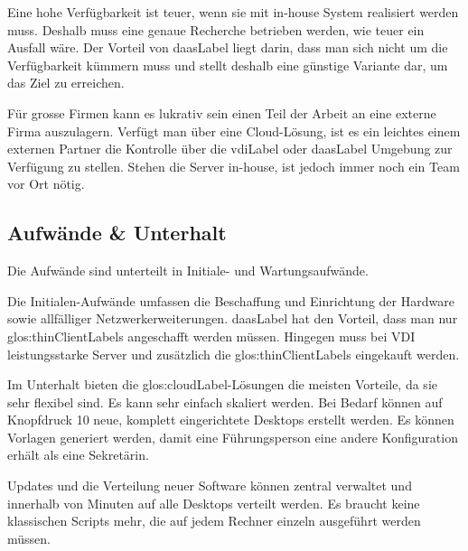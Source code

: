 Eine hohe Verfügbarkeit ist teuer, wenn sie mit in-house System realisiert werden muss. Deshalb muss eine genaue Recherche betrieben werden, wie teuer ein Ausfall wäre. Der Vorteil von \Gls{daasLabel} liegt darin, dass man sich nicht um die Verfügbarkeit kümmern muss und stellt deshalb eine günstige Variante dar, um das Ziel zu erreichen.

Für grosse Firmen kann es lukrativ sein einen Teil der Arbeit an eine externe Firma auszulagern. Verfügt man über eine Cloud-Lösung, ist es ein leichtes einem externen Partner die Kontrolle über die \Gls{vdiLabel} oder \Gls{daasLabel} Umgebung zur Verfügung zu stellen. Stehen die Server in-house, ist jedoch immer noch ein Team vor Ort nötig.

\subsection{Aufwände \& Unterhalt}




Die Aufwände sind unterteilt in Initiale- und Wartungsaufwände.

Die Initialen-Aufwände umfassen die Beschaffung und Einrichtung der Hardware sowie allfälliger Netzwerkerweiterungen. \Gls{daasLabel} hat den Vorteil, dass man nur \glspl{glos:thinClientLabel} angeschafft werden müssen. Hingegen muss bei VDI leistungsstarke Server und zusätzlich die \glspl{glos:thinClientLabel} eingekauft werden.

Im Unterhalt bieten die \Gls{glos:cloudLabel}-Lösungen die meisten Vorteile, da sie sehr flexibel sind. Es kann sehr einfach skaliert werden. Bei Bedarf können auf Knopfdruck 10 neue, komplett eingerichtete Desktops erstellt werden. Es können Vorlagen generiert werden, damit eine Führungsperson eine andere Konfiguration erhält als eine Sekretärin.

Updates und die Verteilung neuer Software können zentral verwaltet und innerhalb von Minuten auf alle Desktops verteilt werden. Es braucht keine klassischen Scripts mehr, die auf jedem Rechner einzeln ausgeführt werden müssen.

